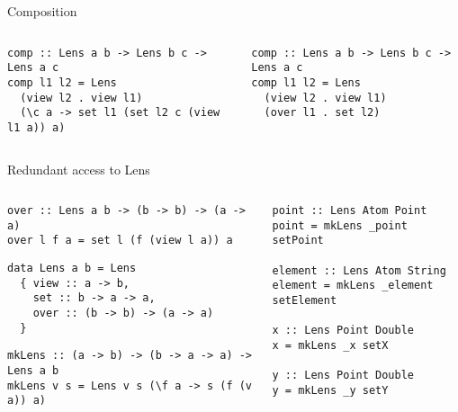 \documentclass[presentation,aspectratio=169,8pt]{beamer}
\begin{document}
\begin{frame}[label={sec:org914e2bd},fragile]{Composition}
 \begin{columns}
\begin{column}{0.5\columnwidth}
\begin{verbatim}
comp :: Lens a b -> Lens b c -> Lens a c
comp l1 l2 = Lens
  (view l2 . view l1)
  (\c a -> set l1 (set l2 c (view l1 a)) a)
\end{verbatim}
\end{column}

\begin{column}{0.5\columnwidth}
\begin{verbatim}
comp :: Lens a b -> Lens b c -> Lens a c
comp l1 l2 = Lens
  (view l2 . view l1)
  (over l1 . set l2)
\end{verbatim}
\end{column}
\end{columns}
\end{frame}

\begin{frame}[label={sec:org4da5e28},fragile]{Redundant access to Lens}
 \begin{columns}
\begin{column}{0.5\columnwidth}
\begin{verbatim}
over :: Lens a b -> (b -> b) -> (a -> a)
over l f a = set l (f (view l a)) a
\end{verbatim}

\pause

\begin{verbatim}
data Lens a b = Lens
  { view :: a -> b,
    set :: b -> a -> a,
    over :: (b -> b) -> (a -> a)
  }
\end{verbatim}

\pause

\begin{verbatim}
mkLens :: (a -> b) -> (b -> a -> a) -> Lens a b
mkLens v s = Lens v s (\f a -> s (f (v a)) a)
\end{verbatim}
\end{column}

\begin{column}{0.5\columnwidth}
\pause

\begin{verbatim}
point :: Lens Atom Point
point = mkLens _point setPoint

element :: Lens Atom String
element = mkLens _element setElement

x :: Lens Point Double
x = mkLens _x setX

y :: Lens Point Double
y = mkLens _y setY
\end{verbatim}
\end{column}
\end{columns}
\end{frame}
\end{document}
